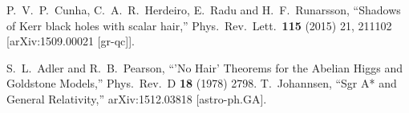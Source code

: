 \documentclass{article}
\numberwithin{equation}{section}
\begin{document}
\begin{small}
\begin{thebibliography}{99}
  P.~V.~P.~Cunha, C.~A.~R.~Herdeiro, E.~Radu and H.~F.~Runarsson,
  ``Shadows of Kerr black holes with scalar hair,''
  Phys.\ Rev.\ Lett.\  {\bf 115} (2015) 21,  211102
  [arXiv:1509.00021 [gr-qc]].




  S.~L.~Adler and R.~B.~Pearson,
  ``'No Hair' Theorems for the Abelian Higgs and Goldstone Models,''
  Phys.\ Rev.\ D {\bf 18} (1978) 2798.
  T.~Johannsen,
  ``Sgr A* and General Relativity,''
  arXiv:1512.03818 [astro-ph.GA].


\end{thebibliography}

 \end{small}
\end{document}
